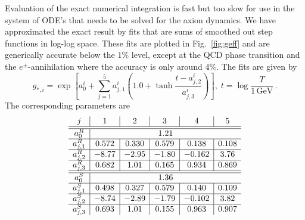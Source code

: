 \documentclass[preprint,nofootinbib]{revtex4}
\newcommand{\reffig}[1]{Fig.~\ref{#1}}
\newcommand{\units}[1]{\, \mathrm{#1}}
\begin{document}
Evaluation of the exact numerical integration is fast but too slow for use in the system of ODE's that needs to be solved for the axion dynamics. We have approximated the exact result by fits that are sums of smoothed out step functions in log-log space. These fits are plotted in \reffig{fig:geff} and are generically accurate below the $1\%$ level, except at the QCD phase transition and the $e^\pm$-annihilation where the accuracy is only around $4\%$. The fits are given by
\begin{equation}
 g_{*,i}=\exp\left[a^i_0+\sum_{j=1}^5 a^i_{j,1}\left(1.0+\tanh\frac{t-a^i_{j,2}}{a^i_{j,3}}\right)\right],\;t=\log\frac{T}{1\units{GeV}}\,.
\end{equation}
The corresponding parameters are
\begin{equation}
 \begin{array}{c|c|c|c|c|c}
  j & 1 & 2 & 3 & 4 & 5 \\\hline\hline
  a^R_0 & \multicolumn{5}{c}{1.21}\\\hline
  a^R_{j,1} & 0.572 & 0.330 & 0.579 & 0.138 & 0.108 \\\hline
  a^R_{j,2} & -8.77 & -2.95 & -1.80 & -0.162 & 3.76 \\\hline
  a^R_{j,3} & 0.682 & 1.01 & 0.165 & 0.934 & 0.869 \\\hline\hline
  a^S_0 & \multicolumn{5}{c}{1.36}\\\hline
  a^S_{j,1} & 0.498 & 0.327 & 0.579 & 0.140 & 0.109 \\\hline
  a^S_{j,2} & -8.74 & -2.89 & -1.79 & -0.102 & 3.82 \\\hline
  a^S_{j,3} & 0.693 & 1.01 & 0.155 & 0.963 & 0.907
 \end{array}
\end{equation}

%

\end{document}
